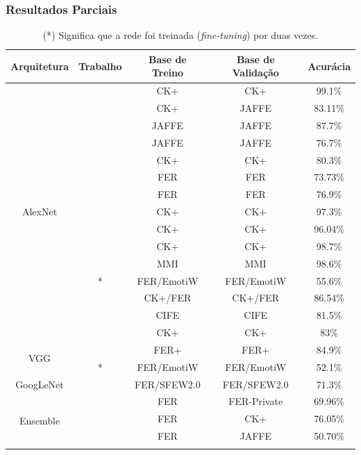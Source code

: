 \documentclass{beamer}
\begin{document}
\begin{frame}
 \frametitle{Resultados Parciais}
\begin{table}[]
\tiny
\centering
\caption{(*) Significa que a rede foi treinada (\emph{fine-tuning}) por duas vezes.}
\label{my-label}
\begin{tabular}{|c|c|c|c|c|}
\hline
\textbf{Arquitetura} & \textbf{Trabalho} & \textbf{Base de Treino} & \textbf{Base de Validação} & \textbf{Acurácia} \\ \hline
\multirow{15}{*}{AlexNet} & \multirow{3}{*}{\cite{art1}} & CK+ & CK+ & 99.1\% \\ \cline{3-5} 
 &  & CK+ & JAFFE & 83.11\% \\ \cline{3-5} 
 &  & JAFFE & JAFFE & 87.7\% \\ \cline{2-5} 
 & \multirow{2}{*}{\cite{art2}} & JAFFE & JAFFE & 76.7\% \\ \cline{3-5} 
 &  & CK+ & CK+ & 80.3\% \\ \cline{2-5} 
 & \cite{art4} & FER & FER & 73.73\% \\ \cline{2-5} 
 & \multirow{2}{*}{\cite{art7}} & FER & FER & 76.9\% \\ \cline{3-5} 
 &  & CK+ & CK+ & 97.3\% \\ \cline{2-5} 
 & \cite{art9} & CK+ & CK+ & 96.04\% \\ \cline{2-5} 
 & \multirow{2}{*}{\cite{art11}} & CK+ & CK+ & 98.7\% \\ \cline{3-5} 
 &  & MMI & MMI & 98.6\% \\ \cline{2-5} 
 & \cite{art13}* & FER/EmotiW & FER/EmotiW & 55.6\% \\ \cline{2-5} 
 & \cite{art14} & CK+/FER & CK+/FER & 86.54\% \\ \cline{2-5} 
 & \multirow{2}{*}{\cite{art15}} & CIFE & CIFE & 81.5\% \\ \cline{3-5} 
 &  & CK+ & CK+ & 83\% \\ \hline
\multirow{2}{*}{VGG} & \cite{art8} & FER+ & FER+ & 84.9\% \\ \cline{2-5} 
 & \cite{art13}* & FER/EmotiW & FER/EmotiW & 52.1\% \\ \hline
GoogLeNet & \cite{art10} & FER/SFEW2.0 & FER/SFEW2.0 & 71.3\% \\ \hline
\multirow{10}{*}{Ensemble} & \multirow{4}{*}{\cite{art3}} & FER & FER-Private & 69.96\% \\ \cline{3-5} 
 &  & FER & CK+ & 76.05\% \\ \cline{3-5} 
 &  & FER & JAFFE & 50.70\% \\ \cline{3-5} 

\end{tabular}
\end{table}
\end{frame}
\end{document}
